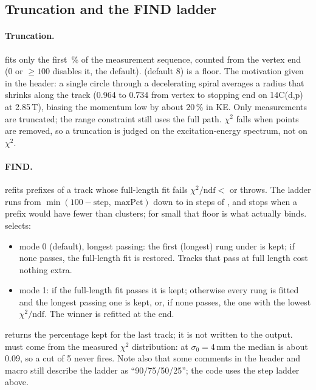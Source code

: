 \subsection{Truncation and the FIND ladder}
\label{sec:gf-find}

\paragraph{Truncation.}  fits only the first \,\% of the measurement sequence,
counted from the vertex end (0 or $\ge100$ disables it, the default).  (default 8) is a
floor. The motivation given in the header: a single circle through a decelerating spiral averages a radius that shrinks
along the track (0.964 to 0.734 from vertex to stopping end on 14C(d,p) at 2.85\,T), biasing the momentum low by about
20\,\% in KE. Only measurements are truncated; the range constraint still uses the full path. $\chi^2$ falls when points
are removed, so a truncation is judged on the excitation-energy spectrum, not on $\chi^2$.

\paragraph{FIND.}  refits prefixes of a track
whose full-length fit fails $\chi^2/\mathrm{ndf}<$  or throws. The ladder runs from
$\min(100-\mathrm{step},\ \mathrm{maxPct})$ down to  in steps of , and stops when a prefix
would have fewer than  clusters; for small  that floor is what actually
binds.  selects:
\begin{itemize}
\item mode 0 (default), longest passing: the first (longest) rung under  is kept; if none passes, the
  full-length fit is restored. Tracks that pass at full length cost nothing extra.
\item mode 1: if the full-length fit passes it is kept; otherwise every rung is fitted and the longest passing one is
  kept, or, if none passes, the one with the lowest $\chi^2/\mathrm{ndf}$. The winner is refitted at the end.
\end{itemize}
 returns the percentage kept for the last track; it is not written to the output.
 must come from the measured $\chi^2$ distribution: at $\sigma_0=4$\,mm the median is about 0.09, so a cut
of 5 never fires. Note also that some comments in the header and macro still describe the ladder as ``90/75/50/25'';
the code uses the step ladder above.

